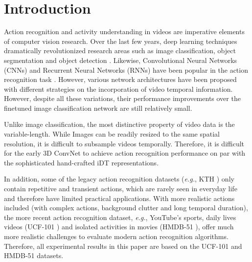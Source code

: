 \documentclass[runningheads,a4paper]{llncs}
\begin{document}
\section{Introduction}

Action recognition and activity understanding in videos are imperative elements of computer vision research. Over the last few years, deep learning techniques dramatically revolutionized research areas such as image classification, object segmentation\cite{wang2011automatic,wang2017video,long2015fully} and object detection \cite{ji20133d,karpathy2014large,zhang2012fast,s17061341,abeida2013iterative,carreira2017quo}. Likewise, Convolutional Neural Networks (CNNs) and Recurrent Neural Networks (RNNs) have been popular in the action recognition task \cite{simonyan2014two,yue2015beyond,wang2016temporal,carreira2017quo,donahue2015long,tran2015learning,cheron2015p,feichtenhofer2016convolutional,huang2018video}. However, various network architectures have been proposed with different strategies on the incorporation of video temporal information. However, despite all these variations, their performance improvements over the finetuned image classification network are still relatively small.


Unlike image classification, the most distinctive property of video data is the variable-length. While Images can be readily resized to the same spatial resolution, it is difficult to subsample videos temporally. Therefore, it is difficult for the early 3D ConvNet \cite{ji20133d} to achieve action recognition performance on par with the sophisticated hand-crafted iDT \cite{wang2013action} representations.


In addition, some of the legacy action recognition datasets ({\em e.g.}, KTH \cite{schuldt2004recognizing}) only contain repetitive and transient actions, which are rarely seen in everyday life and therefore have limited practical applications. With more realistic actions included (with complex actions, background clutter and long temporal duration), the more recent action recognition dataset, {\em e.g.}, YouTube's sports, daily lives videos (UCF-101 \cite{soomro2012ucf101}) and isolated activities in movies (HMDB-51 \cite{kuehne2013hmdb51}), offer much more realistic challenges to evaluate modern action recognition algorithms. Therefore, all experimental results in this paper are based on the UCF-101 and HMDB-51 datasets.
\end{document}
